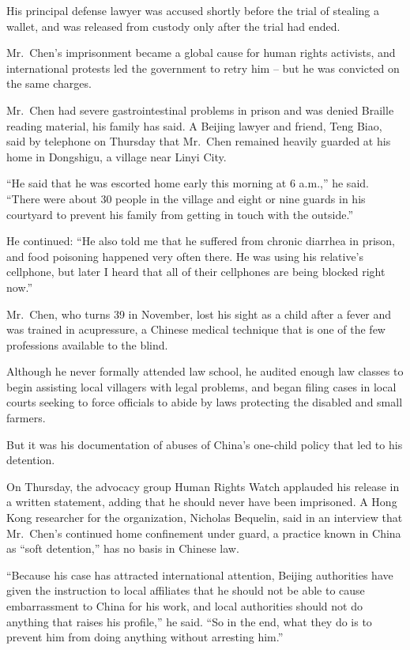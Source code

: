 ﻿\documentclass[12pt]{article}
\begin{document}
His principal defense lawyer was accused shortly before the trial of stealing a wallet, and was
released from custody only after the trial had ended.

Mr.~Chen's imprisonment became a global cause for human rights activists, and international protests
led the government to retry him -- but he was convicted on the same charges.

Mr.~Chen had severe gastrointestinal problems in prison and was denied Braille reading material, his
family has said. A Beijing lawyer and friend, Teng Biao, said by telephone on Thursday that Mr.~Chen
remained heavily guarded at his home in Dongshigu, a village near Linyi City.

``He said that he was escorted home early this morning at 6 a.m.,'' he said. ``There were about 30
people in the village and eight or nine guards in his courtyard to prevent his family from getting
in touch with the outside.''

He continued: ``He also told me that he suffered from chronic diarrhea in prison, and food poisoning
happened very often there. He was using his relative's cellphone, but later I heard that all of
their cellphones are being blocked right now.''

Mr.~Chen, who turns 39 in November, lost his sight as a child after a fever and was trained in
acupressure, a Chinese medical technique that is one of the few professions available to the blind.

Although he never formally attended law school, he audited enough law classes to begin assisting
local villagers with legal problems, and began filing cases in local courts seeking to force
officials to abide by laws protecting the disabled and small farmers.

But it was his documentation of abuses of China's one-child policy that led to his detention.

On Thursday, the advocacy group Human Rights Watch applauded his release in a written statement,
adding that he should never have been imprisoned. A Hong Kong researcher for the organization,
Nicholas Bequelin, said in an interview that Mr.~Chen's continued home confinement under guard, a
practice known in China as ``soft detention,'' has no basis in Chinese law.

``Because his case has attracted international attention, Beijing authorities have given the
instruction to local affiliates that he should not be able to cause embarrassment to China for his
work, and local authorities should not do anything that raises his profile,'' he said. ``So in the
end, what they do is to prevent him from doing anything without arresting him.''
\end{document}
